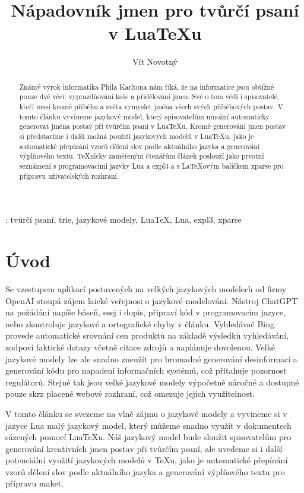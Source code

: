 \documentclass{csbulletin}
\begin{document}

\title{Nápadovník jmen pro tvůrčí psaní v Lua\TeX u}
\author{Vít Novotný}
\maketitle[1ex]

\begin{abstract}
Známý výrok informatika Phila Karltona nám říká, že na informatice jsou obtížné pouze dvě věci: vyprazdňování keše a přidělování jmen. Své o tom vědí i spisovatelé, kteří musí kromě příběhu a světa vymyslet jména všech svých příběhových postav. V tomto článku vyvineme jazykový model, který spisovatelům umožní automaticky generovat jména postav při tvůrčím psaní v Lua\TeX u. Kromě generování jmen postav si představíme i další možná použití jazykových modelů v Lua\TeX u, jako je automatické přepínání vzorů dělení slov podle aktuálního jazyka a generování výplňového textu. \TeX nicky zaměřeným čtenářům článek poslouží jako prvotní seznámení s programovacími jazyky Lua a expl3 a s \LaTeX ovým balíčkem xparse pro přípravu uživatelských rozhraní.
\end{abstract}
\klicovaslova: tvůrčí psaní, trie, jazykové modely, Lua\TeX, Lua, expl3, xparse

\section*{Úvod}

Se vzestupem aplikací postavených na velkých jazykových modelech od firmy OpenAI stoupá zájem laické veřejnosi o jazykové modelování. Nástroj ChatGPT na požádání napíše báseň, esej i dopis, připraví kód v programovacím jazyce, nebo zkontroluje jazykové a ortografické chyby v článku. Vyhledávač Bing provede automatické srovnání cen produktů na základě výsledků vyhledávání, zodpoví faktické dotazy včetně citace zdrojů a naplánuje dovolenou. Velké jazykové modely lze ale snadno zneužít pro hromadné generování desinformací a generování kódu pro napadení informačních systémů, což přitahuje pozornost regulátorů. Stejně tak jsou velké jazykové modely výpočetně náročné a dostupné pouze skrz placené webové rozhraní, což omezuje jejich využitelnost.

V tomto článku se svezeme na vlně zájmu o jazykové modely a vyvineme si v jazyce Lua malý jazykový model, který můžeme snadno využít v dokumentech sázených pomocí Lua\TeX u. Náš jazykový model bude sloužit spisovatelům pro generování kreativních jmen postav při tvůrčím psaní, ale uvedeme si i další potenciální využití jazykových modelů v \TeX u, jako je automatické přepínání vzorů dělení slov podle aktuálního jazyka a generování výplňového textu pro přípravu maket.
\end{document}
